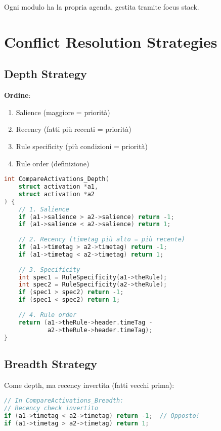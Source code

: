 Ogni modulo ha la propria agenda, gestita tramite focus stack.

\section{Conflict Resolution Strategies}

\subsection{Depth Strategy}

\textbf{Ordine}:
\begin{enumerate}
\item Salience (maggiore = priorità)
\item Recency (fatti più recenti = priorità)
\item Rule specificity (più condizioni = priorità)
\item Rule order (definizione)
\end{enumerate}

\begin{lstlisting}[language=C]
int CompareActivations_Depth(
    struct activation *a1,
    struct activation *a2
) {
    // 1. Salience
    if (a1->salience > a2->salience) return -1;
    if (a1->salience < a2->salience) return 1;
    
    // 2. Recency (timetag più alto = più recente)
    if (a1->timetag > a2->timetag) return -1;
    if (a1->timetag < a2->timetag) return 1;
    
    // 3. Specificity
    int spec1 = RuleSpecificity(a1->theRule);
    int spec2 = RuleSpecificity(a2->theRule);
    if (spec1 > spec2) return -1;
    if (spec1 < spec2) return 1;
    
    // 4. Rule order
    return (a1->theRule->header.timeTag - 
            a2->theRule->header.timeTag);
}
\end{lstlisting}

\subsection{Breadth Strategy}

Come depth, ma recency invertita (fatti vecchi prima):

\begin{lstlisting}[language=C]
// In CompareActivations_Breadth:
// Recency check invertito
if (a1->timetag < a2->timetag) return -1;  // Opposto!
if (a1->timetag > a2->timetag) return 1;
\end{lstlisting}

